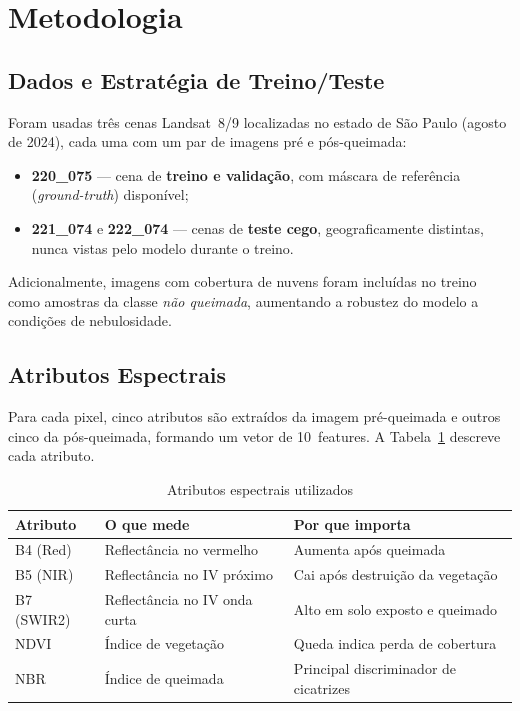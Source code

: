 \documentclass[conference]{IEEEtran}
\begin{document}
\section{Metodologia}

\subsection{Dados e Estratégia de Treino/Teste}

Foram usadas três cenas Landsat~8/9 localizadas no estado de São Paulo
(agosto de 2024), cada uma com um par de imagens pré e pós-queimada:

\begin{itemize}
  \item \textbf{220\_075} — cena de \textbf{treino e validação}, com máscara
        de referência (\textit{ground-truth}) disponível;
  \item \textbf{221\_074} e \textbf{222\_074} — cenas de \textbf{teste cego},
        geograficamente distintas, nunca vistas pelo modelo durante o treino.
\end{itemize}

Adicionalmente, imagens com cobertura de nuvens foram incluídas no treino
como amostras da classe \textit{não queimada}, aumentando a robustez do
modelo a condições de nebulosidade.

\subsection{Atributos Espectrais}

Para cada pixel, cinco atributos são extraídos da imagem pré-queimada e
outros cinco da pós-queimada, formando um vetor de 10~features.
A Tabela~\ref{tab:features} descreve cada atributo.

\begin{table}[!t]
  \caption{Atributos espectrais utilizados}
  \label{tab:features}
  \centering
  \begin{tabular}{lll}
    \toprule
    \textbf{Atributo} & \textbf{O que mede} & \textbf{Por que importa} \\
    \midrule
    B4 (Red) & Reflectância no vermelho
             & Aumenta após queimada \\
    B5 (NIR) & Reflectância no IV próximo
             & Cai após destruição da vegetação \\
    B7 (SWIR2) & Reflectância no IV onda curta
               & Alto em solo exposto e queimado \\
    NDVI & Índice de vegetação
         & Queda indica perda de cobertura \\
    NBR  & Índice de queimada
         & Principal discriminador de cicatrizes \\
    \bottomrule
  \end{tabular}
\end{table}
\end{document}
